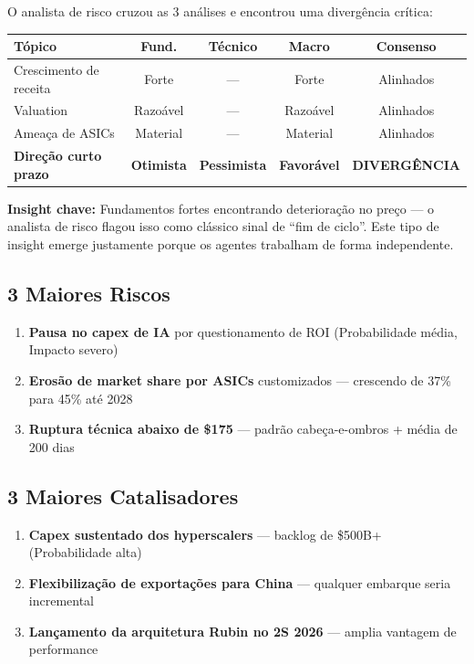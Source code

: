 \documentclass[11pt,a4paper]{article}
\begin{document}
O analista de risco cruzou as 3 an\'alises e encontrou uma diverg\^encia cr\'itica:

\begin{table}[h]
\centering
\begin{tabularx}{\textwidth}{lcccc}
\toprule
\textbf{T\'opico} & \textbf{Fund.} & \textbf{T\'ecnico} & \textbf{Macro} & \textbf{Consenso} \\
\midrule
Crescimento de receita & Forte & --- & Forte & Alinhados \\
Valuation & Razo\'avel & --- & Razo\'avel & Alinhados \\
Amea\c{c}a de ASICs & Material & --- & Material & Alinhados \\
\textbf{Dire\c{c}\~ao curto prazo} & \textbf{Otimista} & \textbf{Pessimista} & \textbf{Favor\'avel} & \textbf{DIVERG\^ENCIA} \\
\bottomrule
\end{tabularx}
\end{table}

\textbf{Insight chave:} Fundamentos fortes encontrando deteriora\c{c}\~ao no pre\c{c}o --- o analista de risco flagou isso como cl\'assico sinal de ``fim de ciclo''. Este tipo de insight emerge justamente porque os agentes trabalham de forma independente.

\subsection{3 Maiores Riscos}
\begin{enumerate}[nosep]
  \item \textbf{Pausa no capex de IA} por questionamento de ROI (Probabilidade m\'edia, Impacto severo)
  \item \textbf{Eros\~ao de market share por ASICs} customizados --- crescendo de 37\% para 45\% at\'e 2028
  \item \textbf{Ruptura t\'ecnica abaixo de \$175} --- padr\~ao cabe\c{c}a-e-ombros + m\'edia de 200 dias
\end{enumerate}

\subsection{3 Maiores Catalisadores}
\begin{enumerate}[nosep]
  \item \textbf{Capex sustentado dos hyperscalers} --- backlog de \$500B+ (Probabilidade alta)
  \item \textbf{Flexibiliza\c{c}\~ao de exporta\c{c}\~oes para China} --- qualquer embarque seria incremental
  \item \textbf{Lan\c{c}amento da arquitetura Rubin no 2S 2026} --- amplia vantagem de performance
\end{enumerate}
\end{document}
